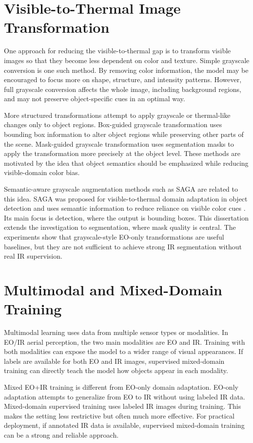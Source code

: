 \section{Visible-to-Thermal Image Transformation}

One approach for reducing the visible-to-thermal gap is to transform visible images so that they become less dependent on color and texture. Simple grayscale conversion is one such method. By removing color information, the model may be encouraged to focus more on shape, structure, and intensity patterns. However, full grayscale conversion affects the whole image, including background regions, and may not preserve object-specific cues in an optimal way.

More structured transformations attempt to apply grayscale or thermal-like changes only to object regions. Box-guided grayscale transformation uses bounding box information to alter object regions while preserving other parts of the scene. Mask-guided grayscale transformation uses segmentation masks to apply the transformation more precisely at the object level. These methods are motivated by the idea that object semantics should be emphasized while reducing visible-domain color bias.

Semantic-aware grayscale augmentation methods such as SAGA are related to this idea. SAGA was proposed for visible-to-thermal domain adaptation in object detection and uses semantic information to reduce reliance on visible color cues \cite{saga2025}. Its main focus is detection, where the output is bounding boxes. This dissertation extends the investigation to segmentation, where mask quality is central. The experiments show that grayscale-style EO-only transformations are useful baselines, but they are not sufficient to achieve strong IR segmentation without real IR supervision.

\section{Multimodal and Mixed-Domain Training}

Multimodal learning uses data from multiple sensor types or modalities. In EO/IR aerial perception, the two main modalities are EO and IR. Training with both modalities can expose the model to a wider range of visual appearances. If labels are available for both EO and IR images, supervised mixed-domain training can directly teach the model how objects appear in each modality.

Mixed EO+IR training is different from EO-only domain adaptation. EO-only adaptation attempts to generalize from EO to IR without using labeled IR data. Mixed-domain supervised training uses labeled IR images during training. This makes the setting less restrictive but often much more effective. For practical deployment, if annotated IR data is available, supervised mixed-domain training can be a strong and reliable approach.

